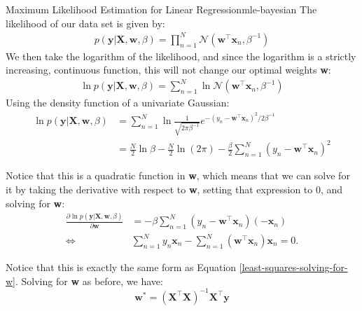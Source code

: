\begin{derivation}{Maximum Likelihood Estimation for Linear Regression}{mle-bayesian}
    The likelihood of our data set is given by:
    \begin{align*}
        p(\textbf{y} | \textbf{X}, \textbf{w}, \beta) = \prod_{n=1}^{N} \mathcal{N}(\textbf{w}^\top\textbf{x}_{n}, \beta^{-1})
    \end{align*}
    We then take the logarithm of the likelihood, and since the logarithm is a strictly increasing, continuous function, this will not change our optimal weights \textbf{w}:
    \begin{align*}
        \ln{p(\textbf{y} | \textbf{X}, \textbf{w}, \beta)} = \sum_{n=1}^{N} \ln{\mathcal{N}(\textbf{w}^\top\textbf{x}_{n}, \beta^{-1})}
    \end{align*}
    Using the density function of a univariate Gaussian:
    \begin{align*}
        \ln{p(\textbf{y} | \textbf{X}, \textbf{w}, \beta)} &= \sum_{n=1}^{N} \ln{\frac{1}{\sqrt{2\pi\beta^{-1}}} e^{-(y_{n} - \textbf{w}^\top\textbf{x}_{n})^2 / 2\beta^{-1}}} \\
        &= \frac{N}{2}\ln{\beta} - \frac{N}{2}\ln{(2\pi)} - \frac{\beta}{2} \sum_{n=1}^{N} (y_{n} - \textbf{w}^\top\textbf{x}_{n})^2
    \end{align*}

    Notice that this is a quadratic function in \textbf{w}, which means that we can solve for it by taking the derivative with respect to \textbf{w}, setting that expression to 0, and solving for \textbf{w}:
    \begin{align*}
      \frac{\partial \ln{p(\textbf{y} | \textbf{X}, \textbf{w}, \beta)}}{\partial \textbf{w}} & = -  \beta \sum_{n=1}^{N} (y_{n} - \textbf{w}^\top\textbf{x}_{n})(-\textbf{x}_{n})
      \\
      \Leftrightarrow \quad & 
      \sum_{n=1}^{N} y_{n} \textbf{x}_{n} - \sum_{n=1}^N (\textbf{w}^\top\textbf{x}_n)\textbf{x}_n=0.
    \end{align*}

    Notice that this is exactly the same form as Equation \ref{least-squares-solving-for-w}. Solving for \textbf{w} as before, we have:
    \begin{equation} \label{bayesian-solved-for-w}
        \textbf{w}^{*} = (\textbf{X}^\top\textbf{X})^{-1}\textbf{X}^\top\textbf{y}
    \end{equation}
\end{derivation}

